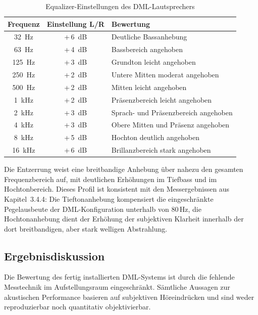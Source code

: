 \begin{table}[H]
\centering
\caption{Equalizer-Einstellungen des DML-Lautsprechers}
\label{tab:equalizer_einstellungen}
\begin{tabularx}{\textwidth}{|c|c|X|}
\hline
\textbf{Frequenz} & \textbf{Einstellung L/R} & \textbf{Bewertung} \\
\hline
\SI{32}{\hertz}   & +\,\SI{6}{\deci\bel}       & Deutliche Bassanhebung \\
\hline
\SI{63}{\hertz}   & +\,\SI{4}{\deci\bel}       & Bassbereich angehoben \\
\hline
\SI{125}{\hertz}  & +\,\SI{3}{\deci\bel}       & Grundton leicht angehoben \\
\hline
\SI{250}{\hertz}  & +\,\SI{2}{\deci\bel}       & Untere Mitten moderat angehoben \\
\hline
\SI{500}{\hertz}  & +\,\SI{2}{\deci\bel}       & Mitten leicht angehoben \\
\hline
\SI{1}{\kilo\hertz}   & +\,\SI{2}{\deci\bel} 	& Präsenzbereich leicht angehoben \\
\hline
\SI{2}{\kilo\hertz}   & +\,\SI{3}{\deci\bel}       & Sprach- und Präsenzbereich angehoben \\
\hline
\SI{4}{\kilo\hertz}   & +\,\SI{3}{\deci\bel}       & Obere Mitten und Präsenz angehoben \\
\hline
\SI{8}{\kilo\hertz}   & +\,\SI{5}{\deci\bel}       & Hochton deutlich angehoben \\
\hline
\SI{16}{\kilo\hertz}  & +\,\SI{6}{\deci\bel}       & Brillanzbereich stark angehoben \\
\hline
\end{tabularx}
\end{table}
 
Die Entzerrung weist eine breitbandige Anhebung über nahezu den gesamten Frequenzbereich auf, mit deutlichen Erhöhungen im Tiefbass und im Hochtonbereich. Dieses Profil ist konsistent mit den Messergebnissen aus Kapitel~3.4.4: Die Tieftonanhebung kompensiert die eingeschränkte Pegelausbeute der DML-Konfiguration unterhalb von 80\,Hz, die Hochtonanhebung dient der Erhöhung der subjektiven Klarheit innerhalb der dort breitbandigen, aber stark welligen Abstrahlung.


\subsection{Ergebnisdiskussion}

Die Bewertung des fertig installierten DML-Systems ist durch die fehlende Messtechnik im Aufstellungsraum eingeschränkt. Sämtliche Aussagen zur akustischen Performance basieren auf subjektiven Höreindrücken und sind weder reproduzierbar noch quantitativ objektivierbar.

